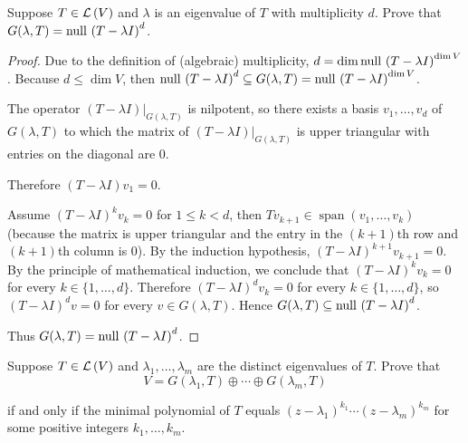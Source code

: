\begin{exercise}\label{chapter8:sectionB:exercise7}
    Suppose $T \in \mathcal{L}\left({V}\right)$ and $\lambda$ is an eigenvalue of $T$ with multiplicity $d$. Prove that $G(\lambda, T) = \operatorname{null}\,{{(T - \lambda I)}^{d}}$.
\end{exercise}

\begin{proof}
    Due to the definition of (algebraic) multiplicity, $d = \dim\operatorname{null}\,{{(T - \lambda I)}^{\dim V}}$. Because $d\leq\dim V$, then $\operatorname{null}\,{{(T - \lambda I)}^{d}}\subseteq G(\lambda, T) = \operatorname{null}\,{{(T - \lambda I)}^{\dim V}}$.

    The operator ${(T - \lambda I)}\vert_{G(\lambda, T)}$ is nilpotent, so there exists a basis $v_{1}, \ldots, v_{d}$ of $G(\lambda, T)$ to which the matrix of ${(T - \lambda I)}\vert_{G(\lambda, T)}$ is upper triangular with entries on the diagonal are $0$.

    Therefore $(T - \lambda I)v_{1} = 0$.

    Assume ${(T - \lambda I)}^{k}v_{k} = 0$ for $1\leq k < d$, then $Tv_{k+1} \in \operatorname{span}(v_{1}, \ldots, v_{k})$ (because the matrix is upper triangular and the entry in the $(k+1)$th row and $(k+1)$th column is $0$). By the induction hypothesis, ${(T - \lambda I)}^{k+1}v_{k+1} = 0$. By the principle of mathematical induction, we conclude that ${(T - \lambda I)}^{k}v_{k} = 0$ for every $k\in\{1,\ldots,d\}$. Therefore ${(T - \lambda I)}^{d}v_{k} = 0$ for every $k\in\{1,\ldots,d\}$, so ${(T - \lambda I)}^{d}v = 0$ for every $v\in G(\lambda, T)$. Hence $G(\lambda, T)\subseteq \operatorname{null}\,{{(T - \lambda I)}^{d}}$.

    Thus $G(\lambda, T) = \operatorname{null}\,{{(T - \lambda I)}^{d}}$.
\end{proof}
\newpage

\begin{exercise}\label{chapter8:sectionB:exercise8}
    Suppose $T\in\mathcal{L}\left({V}\right)$ and $\lambda_{1}, \ldots, \lambda_{m}$ are the distinct eigenvalues of $T$. Prove that
    \[
        V = G(\lambda_{1}, T)\oplus \cdots \oplus G(\lambda_{m}, T)
    \]

    if and only if the minimal polynomial of $T$ equals ${(z - \lambda_{1})}^{k_{1}}\cdots {(z - \lambda_{m})}^{k_{m}}$ for some positive integers $k_{1}, \ldots, k_{m}$.
\end{exercise}


